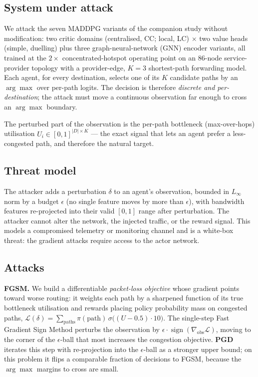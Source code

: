 \documentclass[10pt,journal,comsoc]{IEEEtran}
\begin{document}
\subsection{System under attack}
We attack the seven MADDPG variants of the companion study without modification:
two critic domains (centralised, CC; local, LC) $\times$ two value heads (simple,
duelling) plus three graph-neural-network (GNN) encoder variants, all trained at the
$2\times$ concentrated-hotspot operating point on an 86-node service-provider
topology with a provider-edge, $K{=}3$ shortest-path forwarding model. Each agent,
for every destination, selects one of its $K$ candidate paths by an $\arg\max$ over
per-path logits. The decision is therefore \emph{discrete and per-destination}; the
attack must move a continuous observation far enough to cross an $\arg\max$ boundary.

The perturbed part of the observation is the per-path bottleneck (max-over-hops)
utilisation $U_i \in [0,1]^{|D|\times K}$ --- the exact signal that lets an agent
prefer a less-congested path, and therefore the natural target.

\subsection{Threat model}
The attacker adds a perturbation $\delta$ to an agent's observation, bounded in
$L_\infty$ norm by a budget $\epsilon$ (no single feature moves by more than
$\epsilon$), with bandwidth features re-projected into their valid $[0,1]$ range
after perturbation. The attacker cannot alter the network, the injected traffic, or
the reward signal. This models a compromised telemetry or monitoring channel and is
a white-box threat: the gradient attacks require access to the actor network.

\subsection{Attacks}
\textbf{FGSM.} We build a differentiable \emph{packet-loss objective} whose gradient
points toward worse routing: it weights each path by a sharpened function of its true
bottleneck utilisation and rewards placing policy probability mass on congested
paths, $\mathcal{L}(\delta) = \sum_{\text{paths}} \pi(\text{path})\,
\sigma\!\big((U-0.5)\cdot 10\big)$. The single-step Fast Gradient Sign Method
perturbs the observation by $\epsilon\cdot\operatorname{sign}(\nabla_{\text{obs}}
\mathcal{L})$, moving to the corner of the $\epsilon$-ball that most increases the
congestion objective. \textbf{PGD} iterates this step with re-projection into the
$\epsilon$-ball as a stronger upper bound; on this problem it flips a comparable
fraction of decisions to FGSM, because the $\arg\max$ margins to cross are small.
\end{document}
